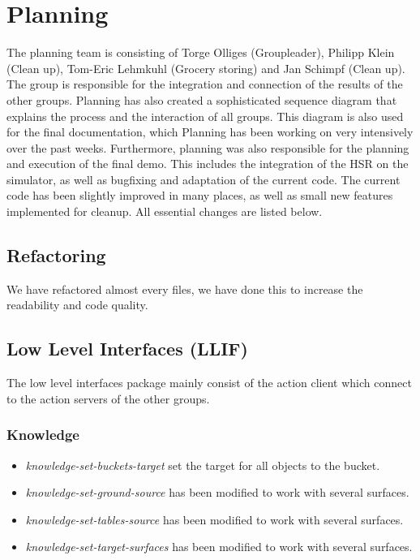 \documentclass[main.tex]{subfiles}
\begin{document}
	
	\chapter{Planning}
                The planning team is consisting of Torge Olliges (Groupleader), Philipp Klein (Clean up), Tom-Eric Lehmkuhl (Grocery storing) and Jan Schimpf (Clean up). The group is responsible for the integration and connection of the results of the other groups. Planning has also created a sophisticated sequence diagram that explains the process and the interaction of all groups. This diagram is also used for the final documentation, which Planning has been working on very intensively over the past weeks. Furthermore, planning was also responsible for the planning and execution of the final demo. This includes the integration of the HSR on the simulator, as well as bugfixing and adaptation of the current code. The current code has been slightly improved in many places, as well as small new features implemented for cleanup. All essential changes are listed below. 
          
          		\section{Refactoring}
	        	    We have refactored almost every files, we have done this to increase the readability and code quality.   
	        	    
	        	\section{Low Level Interfaces (LLIF)}
	                The low level interfaces package mainly consist of the action client which connect to the action servers of the other groups.
                
               
                \subsection{Knowledge}
	                
				    \begin{itemize}
				      \item \textit{knowledge-set-buckets-target} set the target for all objects to the bucket.
				       \item \textit{knowledge-set-ground-source} has been modified to work with several surfaces. 
				       \item \textit{knowledge-set-tables-source} has been modified to work with several surfaces. 
				       \item \textit{knowledge-set-target-surfaces} has been modified to work with several surfaces.
		
				    \end{itemize} 
                                           
\end{document}
